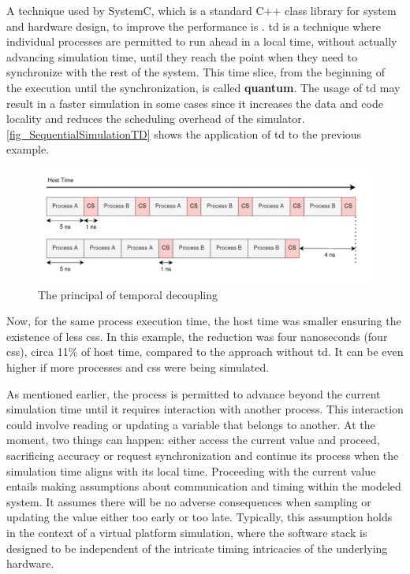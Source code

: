A technique used by SystemC, which is a standard C++ class
library for system and hardware design, to improve the performance is  \cite{systemC}. \gls{td} is a technique where individual 
processes are permitted to run ahead in a local time, without actually advancing simulation time, until they reach the point when they need to 
synchronize with the rest of the system. This time slice, from the beginning of the execution until the synchronization, is called 
\textbf{quantum}. The usage of \gls{td} may result in a faster simulation in some cases since it increases the data and code locality and 
reduces the scheduling overhead of the simulator. \autoref{fig_SequentialSimulationTD} shows the application of \gls{td} to the previous example. 

\begin{figure}[H]
	\centering
 	\includegraphics[width=0.8\linewidth]{Images/SequentialSimulationTD.png}
 	\caption{The principal of temporal decoupling}
	 \label{fig_SequentialSimulationTD}
\end{figure}

Now, for the same process execution time, the host time was smaller ensuring the existence of less \glspl{cs}. In this example, the reduction 
was four nanoseconds (four \glspl{cs}), circa 11\% of host time, compared to the approach without \gls{td}. It can be even higher if more 
processes and \glspl{cs} were being simulated.


As mentioned earlier, the process is permitted to advance beyond the current simulation time until it requires interaction with another process. 
This interaction could involve reading or updating a variable that belongs to another. At the moment, two things can happen: either access the 
current value and proceed, sacrificing accuracy or request synchronization and continue its process when the simulation time aligns with its 
local time. Proceeding with the current value entails making assumptions about communication and timing within the modeled system. It assumes 
there will be no adverse consequences when sampling or updating the value either too early or too late. Typically, this assumption holds in 
the context of a virtual platform simulation, where the software stack is designed to be independent of the intricate timing intricacies of 
the underlying hardware.

